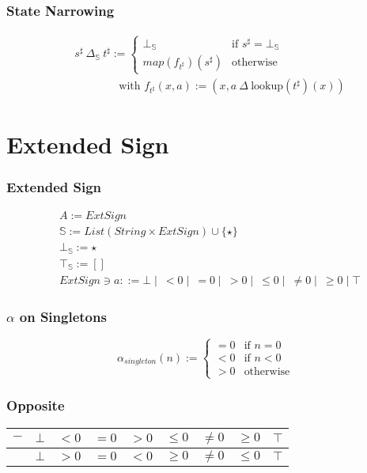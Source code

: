 \documentclass{beamer}
\begin{document}
\begin{frame}
    \frametitle{State Narrowing}
    \begin{align*} 
        &s^{\sharp}\ \Delta_\mathbb{S}\ t^{\sharp} := \begin{cases}
                                                    \bot_\mathbb{S} & \text{if } s^{\sharp} = \bot_\mathbb{S}\\
                                                    map (f_{t^{\sharp}}) (s^{\sharp}) & \text{otherwise}
                                                    \end{cases} \\
                & \qquad \qquad \text{with } f_{t^{\sharp}}(x, a) := (x, a\ \Delta\ \text{lookup} (t^{\sharp}) (x))
                                                \end{align*}
\end{frame}

\section{Extended Sign}

\begin{frame}
    \frametitle{Extended Sign}
    \begin{align*}
        &A := ExtSign\\
        &\mathbb{S} := List(String \times ExtSign) \cup \{ \star \} \\
        &\bot_\mathbb{S} := \star \\
        &\top_\mathbb{S} := [] \\
        &ExtSign \ni a ::= \bot \mid\ < 0 \mid\ = 0 \mid\ > 0 \mid\ \le 0 \mid\ \ne 0 \mid\ \ge 0 \mid \top
    \end{align*}
\end{frame}

\begin{frame}
    \frametitle{\( \alpha \) on Singletons}
    \[
        \alpha_{singleton}(n) := \begin{cases}
            =0 & \text{if } n=0\\
            <0 & \text{if } n<0\\
            >0 & \text{otherwise}
        \end{cases}    
    \]
\end{frame}


\begin{frame}
    \frametitle{Opposite}

    \begin{table}[]
        \begin{tabular}{|l|l|l|l|l|l|l|l|l|}
        \hline
        \textbf{$-$} & \textbf{$\bot$} & \textbf{$< 0$} & \textbf{$= 0$} & \textbf{$> 0$} & \textbf{$\le 0$} & \textbf{$\ne 0$} & \textbf{$\ge 0$} & \textbf{$\top$} \\ \hline
                     & $\bot$          & $> 0$          & $= 0$          & $< 0$          & $\ge 0$          & $\ne 0$          & $\le 0$          & $\top$          \\ \hline
        \end{tabular}
        \end{table}
\end{frame}
\end{document}
